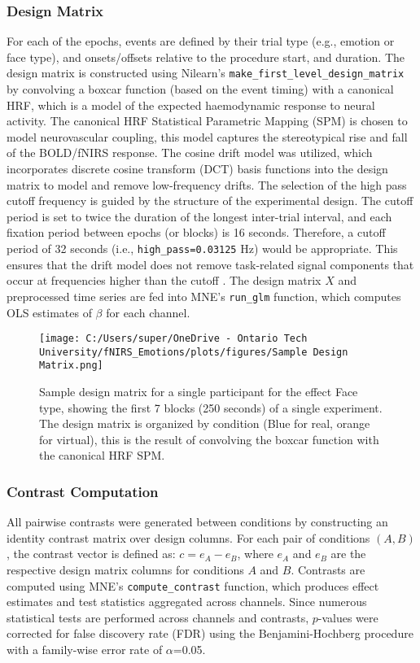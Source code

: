 \subsubsection{Design Matrix}
For each of the epochs, events are defined by their trial type (e.g., emotion or face type), and onsets/offsets relative to the procedure start, and duration.
The design matrix is constructed using Nilearn's \texttt{make\_first\_level\_design\_matrix} by convolving a boxcar function (based on the event timing) with a canonical HRF, which is a model of the expected haemodynamic response to neural activity.
The canonical HRF Statistical Parametric Mapping (SPM) \citep{friston_statistical_2007} is chosen to model neurovascular coupling, this model captures the stereotypical rise and fall of the BOLD/fNIRS response. 
The cosine drift model was utilized, which incorporates discrete cosine transform (DCT) basis functions into the design matrix to model and remove low-frequency drifts.
The selection of the high pass cutoff frequency is guided by the structure of the experimental design. 
The cutoff period is set to twice the duration of the longest inter-trial interval, and each fixation period between epochs (or blocks) is 16 seconds. 
Therefore, a cutoff period of 32 seconds (i.e., \texttt{high\_pass=0.03125} Hz) would be appropriate. 
This ensures that the drift model does not remove task-related signal components that occur at frequencies higher than the cutoff \citep{luke_analysis_2021}.
The design matrix \( X \) and preprocessed time series are fed into MNE's \texttt{run\_glm} function, which computes OLS estimates of \( \beta \) for each channel.

\begin{figure}[H]
    \centering
    \texttt{[image: C:/Users/super/OneDrive - Ontario Tech University/fNIRS\_Emotions/plots/figures/Sample Design Matrix.png]}
    \caption[Sample design matrix for GLM]{Sample design matrix for a single participant for the effect Face type, showing the first 7 blocks (250 seconds) of a single experiment.
    The design matrix is organized by condition (Blue for real, orange for virtual), this is the result of convolving the boxcar function with the canonical HRF SPM. }
    \label{fig:design_matrix}
\end{figure}

\subsubsection{Contrast Computation}
\label{sec:contrast_computation}
All pairwise contrasts were generated between conditions by constructing an identity contrast matrix over design columns. 
For each pair of conditions \( (A, B) \), the contrast vector is defined as: $c = e_A - e_B$, where \( e_A \) and \( e_B \) are the respective design matrix columns for conditions \( A \) and \( B \). 
Contrasts are computed using MNE's \texttt{compute\_contrast} function, which produces effect estimates and test statistics aggregated across channels.
Since numerous statistical tests are performed across channels and contrasts, $p$-values were corrected for false discovery rate (FDR) using the Benjamini-Hochberg procedure \citep{singh_exploring_2006} with a family-wise error rate of $\alpha$=0.05.

